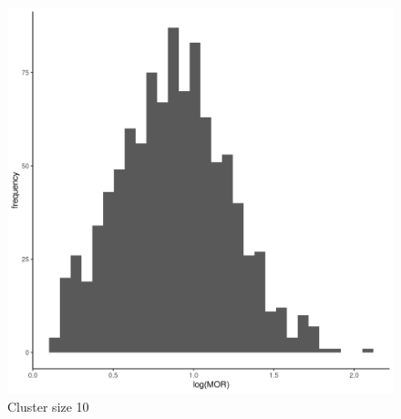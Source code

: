 \documentclass[
  letterpaper,
  DIV=11,
  numbers=noendperiod,
  titlepage]{scrartcl}
\begin{document}
\begin{figure}
\begin{minipage}[t]{0.24\linewidth}
{{\includegraphics{../../plots/two-lvl-ran-slope/low-prev/hist_100_10_two_lvl_slp_low_prev_q3.png}

}

\caption{Cluster size 10}

}

\end{minipage}%
%
\begin{minipage}[t]{0.24\linewidth}

{\centering 

}
\end{minipage}
\end{figure}
\end{document}
